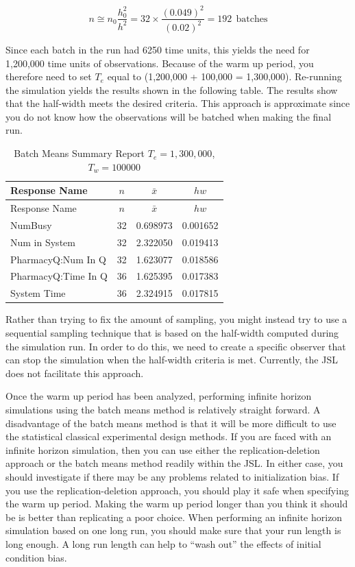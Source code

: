 \documentclass[
]{book}
\theoremstyle{definition}
\theoremstyle{definition}
\theoremstyle{definition}
\theoremstyle{definition}
\theoremstyle{remark}
\begin{document}
\[n \cong n_0 \dfrac{h_0^2}{h^2} = 32 \times \dfrac{(0.049)^2}{(0.02)^2} = 192 \ \ \text{batches}\]

Since each batch in the run had 6250 time units, this yields the need
for 1,200,000 time units of observations. Because of the warm up period,
you therefore need to set \(T_e\) equal to (1,200,000 + 100,000 =
1,300,000). Re-running the simulation yields the results shown in
the following table. The results show that the half-width meets
the desired criteria. This approach is approximate since you do not know
how the observations will be batched when making the final run.

\begin{longtable}[]{@{}lccc@{}}
\caption{Batch Means Summary Report \(T_e = 1,300,000\), \(T_w = 100000\)}\tabularnewline
\toprule
Response Name & \(n\) & \(\bar{x}\) & \(hw\) \\
\midrule
\endfirsthead
\toprule
Response Name & \(n\) & \(\bar{x}\) & \(hw\) \\
\midrule
\endhead
NumBusy & 32 & 0.698973 & 0.001652 \\
Num in System & 32 & 2.322050 & 0.019413 \\
PharmacyQ:Num In Q & 32 & 1.623077 & 0.018586 \\
PharmacyQ:Time In Q & 36 & 1.625395 & 0.017383 \\
System Time & 36 & 2.324915 & 0.017815 \\
\bottomrule
\end{longtable}

Rather than trying to fix the amount of sampling, you might instead try
to use a sequential sampling technique that is based on the half-width
computed during the simulation run. In order to do this, we need to
create a specific observer that can stop the simulation when the
half-width criteria is met. Currently, the JSL does not facilitate this approach.

Once the warm up period has been analyzed, performing infinite horizon
simulations using the batch means method is relatively straight forward.
A disadvantage of the batch means method is that it will be more
difficult to use the statistical classical experimental design methods.
If you are faced with an infinite horizon simulation, then you can use
either the replication-deletion approach or the batch means method
readily within the JSL. In either case, you should investigate if there
may be any problems related to initialization bias. If you use the
replication-deletion approach, you should play it safe when specifying
the warm up period. Making the warm up period longer than you think it
should be is better than replicating a poor choice. When performing an
infinite horizon simulation based on one long run, you should make sure
that your run length is long enough. A long run length can help to ``wash
out'' the effects of initial condition bias.
\end{document}
